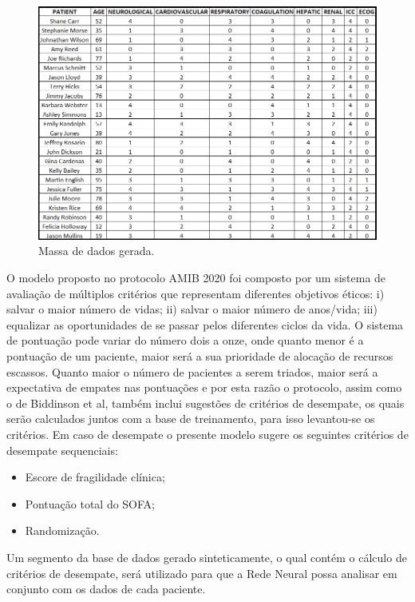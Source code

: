 \documentclass[12pt]{article}
\begin{document}
\begin{figure}[!htb]
    \centering
    \includegraphics[scale=0.6]{img/massa de dados gerada.png}
    \centering
    \caption{Massa de dados gerada.}
    \label{subexpressao}
\end{figure}

O modelo proposto no protocolo AMIB 2020 foi composto por um sistema de avaliação de múltiplos critérios que representam diferentes objetivos éticos: i) salvar o maior número de vidas; ii) salvar o maior número de anos/vida; iii) equalizar as oportunidades de se passar pelos diferentes ciclos da vida. O sistema de pontuação pode variar do número dois a onze, onde quanto menor é a pontuação de um paciente, maior será a sua prioridade de alocação de recursos escassos. Quanto maior o número de pacientes a serem triados, maior será a expectativa de empates nas pontuações e por esta razão o protocolo, assim como o de Biddinson et al, também inclui sugestões de critérios de desempate, os quais serão calculados juntos com a base de treinamento, para isso levantou-se os critérios. Em caso de desempate o presente modelo sugere os seguintes critérios de desempate sequenciais:
\begin{itemize}
  \item Escore de fragilidade clínica;
  \item Pontuação total do SOFA;
  \item Randomização.
\end{itemize}

Um segmento da base de dados gerado sinteticamente, o qual contém o cálculo de critérios de desempate, será utilizado para que a Rede Neural possa analisar em conjunto com os dados de cada paciente.
\end{document}
